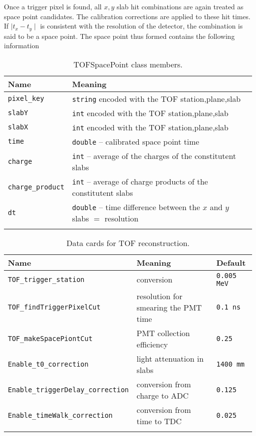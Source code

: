 \begin{itemize}
Once a trigger pixel is found, all $x,y$ slab hit combinations are again treated as space point candidates. The calibration corrections are applied to these hit times. If $\mid t_x - t_y \mid$ is consistent with the resolution of the detector, the combination is said to be a space point. The space point thus formed contains the following information
\begin{table*}
\begin{center}
\caption{TOFSpacePoint class members.}
\begin{tabularx}{\linewidth}{lX}
\hline
Name & Meaning \\
\hline
\verb|pixel_key| & \verb|string| encoded with the TOF station,plane,slab\\
\verb|slabY| & \verb|int| encoded with the TOF station,plane,slab\\
\verb|slabX| & \verb|int| encoded with the TOF station,plane,slab\\
\verb|time| & \verb|double| -- calibrated space point time\\
\verb|charge| & \verb|int| -- average of the charges of the constitutent slabs\\
\verb|charge_product| & \verb|int| -- average of charge products of the constitutent slabs\\
\verb|dt| & \verb|double| -- time difference between the $x$ and $y$ slabs $=$ resolution\\
\begin{makeimage} %
\end{makeimage} 
\end{tabularx}
\end{center}
\end{table*}

\end{itemize}
\begin{table*}
\begin{center}
\caption{Data cards for TOF reconstruction.}
\begin{tabularx}{\linewidth}{lXX}
\hline
Name & Meaning & Default\\
\hline
\verb|TOF_trigger_station| & conversion & \verb|0.005 MeV|\\
\verb|TOF_findTriggerPixelCut| & resolution for smearing the PMT time& \verb|0.1 ns|\\
\verb|TOF_makeSpacePiontCut| & PMT collection efficiency & \verb|0.25| \\
\verb|Enable_t0_correction| & light attenuation in slabs & \verb|1400 mm|\\
\verb|Enable_triggerDelay_correction| & conversion from charge to ADC & \verb|0.125|\\
\verb|Enable_timeWalk_correction| & conversion from time to TDC & \verb|0.025|\\
\begin{makeimage} %
\end{makeimage} 
\end{tabularx}
\end{center}
\end{table*}
